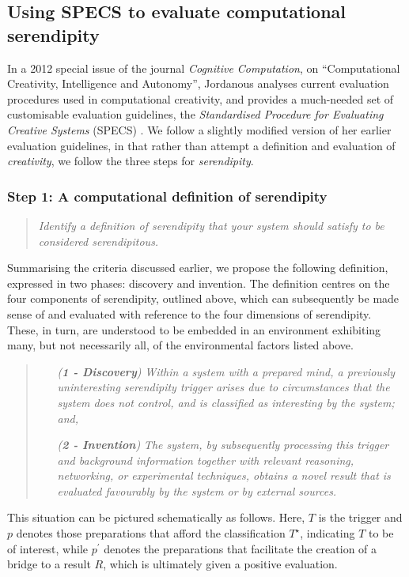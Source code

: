 \subsection{Using SPECS to evaluate computational serendipity}\label{specs-overview}

In a 2012 special issue of the journal {\em Cognitive Computation}, on
``Computational Creativity, Intelligence and Autonomy'', Jordanous
analyses current evaluation procedures used in computational
creativity, and provides a much-needed set of customisable evaluation
guidelines, the \emph{Standardised Procedure for Evaluating Creative
  Systems} (SPECS) \cite{jordanous:12}.
%
We follow a slightly modified version of her earlier evaluation
guidelines, in that rather than attempt a definition and evaluation of
{\em creativity}, we follow the three steps for \emph{serendipity}.

\subsubsection*{Step 1: A computational definition of serendipity}
\begin{quote} {\em Identify a definition of serendipity that your
    system should satisfy to be considered serendipitous.}\end{quote}

Summarising the criteria discussed earlier, we propose the following
definition, expressed in two phases: discovery and invention.  The
definition centres on the four components of serendipity, outlined
above, which can subsequently be made sense of and evaluated with
reference to the four dimensions of serendipity.  These, in turn, are
understood to be embedded in an environment exhibiting many, but not
necessarily all, of the environmental factors listed above.

\begin{quote}
\begin{enumerate}[itemsep=2pt,labelwidth=9em,leftmargin=6em,rightmargin=2em]
\item[\emph{(\textbf{1 - Discovery})}] \emph{Within a system with a prepared mind, a previously uninteresting serendipity trigger arises due to circumstances that the system does not control, and is classified as interesting by the system; and,}
\item[\emph{(\textbf{2 - Invention})}] \emph{The system, by subsequently processing this trigger and background information together with relevant reasoning, networking, or experimental techniques, obtains a novel result that is evaluated favourably by the system or by external sources.}
\end{enumerate}
\end{quote}

This situation can be pictured schematically as follows.  Here, $T$ is
the trigger and $p$ denotes those preparations that afford the
classification $T^\star$, indicating $T$ to be of interest, while
$p^{\prime}$ denotes the preparations that facilitate the creation of a
bridge to a result $R$, which is ultimately given a positive
evaluation.
